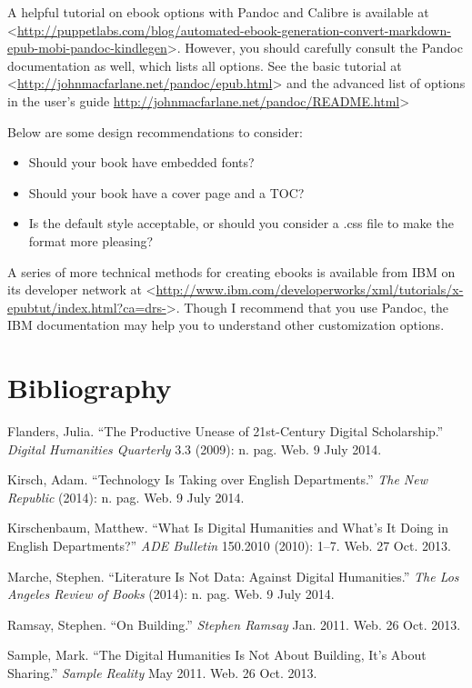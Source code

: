 \documentclass[]{article}
\begin{document}
A helpful tutorial on ebook options with Pandoc and Calibre is available
at
\textless{}\url{http://puppetlabs.com/blog/automated-ebook-generation-convert-markdown-epub-mobi-pandoc-kindlegen}\textgreater{}.
However, you should carefully consult the Pandoc documentation as well,
which lists all options. See the basic tutorial at
\textless{}\url{http://johnmacfarlane.net/pandoc/epub.html}\textgreater{}
and the advanced list of options in the user's guide
\url{http://johnmacfarlane.net/pandoc/README.html}\textgreater{}

Below are some design recommendations to consider:

\begin{itemize}
\itemsep1pt\parskip0pt
\item
  Should your book have embedded fonts?
\item
  Should your book have a cover page and a TOC?
\item
  Is the default style acceptable, or should you consider a .css file to
  make the format more pleasing?
\end{itemize}

A series of more technical methods for creating ebooks is available from
IBM on its developer network at
\textless{}\url{http://www.ibm.com/developerworks/xml/tutorials/x-epubtut/index.html?ca=drs-}\textgreater{}.
Though I recommend that you use Pandoc, the IBM documentation may help
you to understand other customization options.

\section*{Bibliography}\label{bibliography}

Flanders, Julia. ``The Productive Unease of 21st-Century Digital
Scholarship.'' \emph{Digital Humanities Quarterly} 3.3 (2009): n. pag.
Web. 9 July 2014.

Kirsch, Adam. ``Technology Is Taking over English Departments.''
\emph{The New Republic} (2014): n. pag. Web. 9 July 2014.

Kirschenbaum, Matthew. ``What Is Digital Humanities and What's It Doing
in English Departments?'' \emph{ADE Bulletin} 150.2010 (2010): 1--7.
Web. 27 Oct. 2013.

Marche, Stephen. ``Literature Is Not Data: Against Digital Humanities.''
\emph{The Los Angeles Review of Books} (2014): n. pag. Web. 9 July 2014.

Ramsay, Stephen. ``On Building.'' \emph{Stephen Ramsay} Jan. 2011. Web.
26 Oct. 2013.

Sample, Mark. ``The Digital Humanities Is Not About Building, It's About
Sharing.'' \emph{Sample Reality} May 2011. Web. 26 Oct. 2013.
\end{document}
